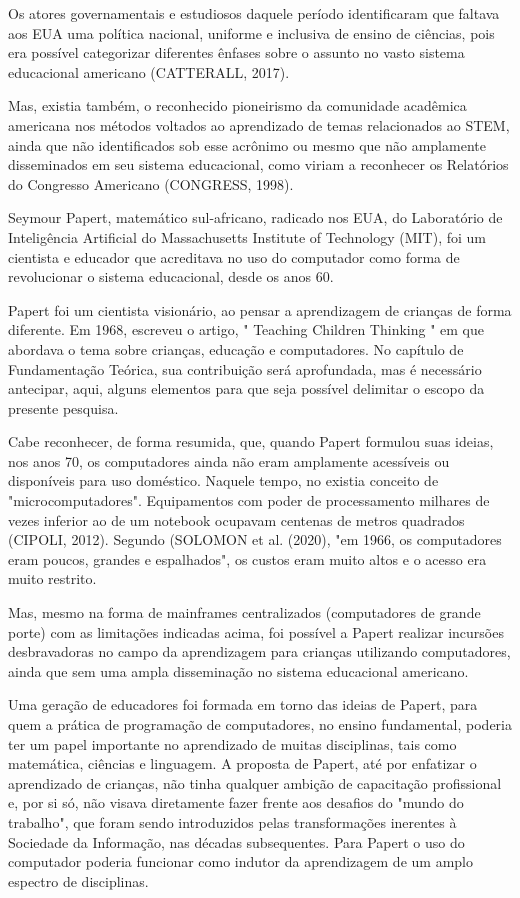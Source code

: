Os atores governamentais e estudiosos daquele período identificaram que faltava aos EUA uma política nacional, uniforme e inclusiva de ensino de ciências, pois era possível categorizar diferentes ênfases sobre o assunto no vasto sistema educacional americano (CATTERALL, 2017).

Mas, existia também, o reconhecido pioneirismo da comunidade acadêmica americana nos métodos voltados ao aprendizado de temas relacionados ao STEM, ainda que não identificados sob esse acrônimo ou mesmo que não amplamente disseminados em seu sistema educacional, como viriam a reconhecer os Relatórios do Congresso Americano (CONGRESS, 1998).

Seymour Papert, matemático sul-africano, radicado nos EUA, do Laboratório de Inteligência Artificial do Massachusetts Institute of Technology (MIT), foi um  cientista e educador que acreditava  no  uso do computador como forma de revolucionar o sistema  educacional,  desde os anos 60.

Papert foi um cientista visionário, ao pensar a aprendizagem de crianças de forma diferente. Em 1968, escreveu o artigo, " Teaching Children Thinking "  em que abordava  o tema sobre crianças, educação e computadores. No capítulo de Fundamentação Teórica, sua contribuição será aprofundada, mas é necessário antecipar, aqui, alguns elementos para que seja possível delimitar o escopo da presente pesquisa.

Cabe reconhecer, de forma resumida, que, quando Papert formulou suas ideias, nos anos 70, os computadores ainda não eram amplamente acessíveis ou disponíveis para uso doméstico. Naquele tempo, no existia conceito de "microcomputadores". Equipamentos com poder de processamento milhares de vezes inferior ao de um notebook ocupavam centenas de metros quadrados (CIPOLI, 2012). Segundo (SOLOMON et al. (2020), "em 1966, os computadores eram poucos, grandes e espalhados", os custos eram muito altos e o acesso era muito restrito.

Mas, mesmo na forma de mainframes centralizados (computadores de grande porte) com as limitações indicadas acima, foi possível a Papert realizar incursões desbravadoras no campo da aprendizagem para crianças utilizando computadores, ainda que sem uma ampla disseminação no sistema educacional americano.

Uma geração de educadores foi formada em torno das ideias de Papert, para quem a prática de programação de computadores, no ensino fundamental, poderia ter um papel importante no aprendizado de muitas disciplinas, tais como matemática, ciências e linguagem. A proposta de Papert, até por enfatizar o aprendizado de crianças, não tinha qualquer ambição de capacitação profissional e, por si só, não visava diretamente fazer frente aos desafios do "mundo do trabalho", que foram sendo introduzidos pelas transformações inerentes à Sociedade da Informação, nas décadas subsequentes. Para Papert o uso do computador poderia funcionar como indutor da aprendizagem de um amplo espectro de disciplinas.

